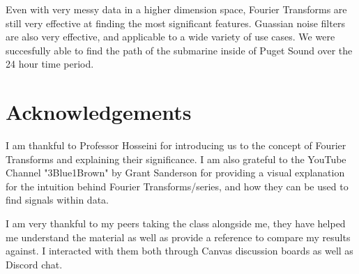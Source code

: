 \documentclass[11pt]{amsart}
\begin{document}
Even with very messy data in a higher dimension space, Fourier Transforms are still very effective at finding 
the most significant features. Guassian noise filters are also very effective, and applicable to a wide variety 
of use cases. We were succesfully able to find the path of the submarine inside of Puget Sound over the 24 hour
time period. 

\section*{Acknowledgements}

I am thankful to Professor Hosseini for introducing us to the concept of Fourier Transforms and explaining
their significance. I am also grateful to the YouTube Channel "3Blue1Brown" by Grant Sanderson for providing
a visual explanation for the intuition behind Fourier Transforms/series, and how they can be used to find 
signals within data. 

I am very thankful to my peers taking the class alongside me, they have helped me understand the material as well
as provide a reference to compare my results against. I interacted with them both through Canvas discussion boards
as well as Discord chat. 



\cite{Hunter:2007}
\cite{harris2020array}
\cite{hosseini3_2022}
\cite{hosseini7_2022}
\end{document}
